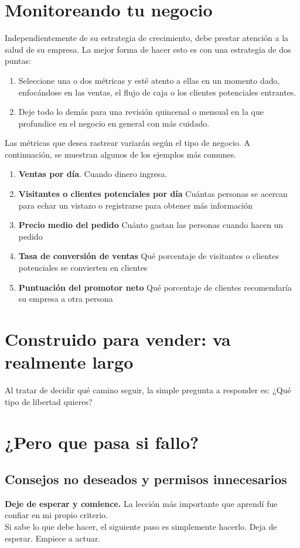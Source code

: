 \documentclass[10pt]{book}
\begin{document}
	\section{Monitoreando tu negocio}	
	    Independientemente de su estrategia de crecimiento, debe prestar atención a la salud de su empresa. La mejor forma de hacer esto es con una estrategia de dos puntas:
	   \begin{enumerate}[\bfseries 1)] 
		   \item Seleccione una o dos métricas y esté atento a ellas en un momento dado, enfocándose en las ventas, el flujo de caja o los clientes potenciales entrantes.
		    \item Deje todo lo demás para una revisión quincenal o mensual en la que profundice en el negocio en general con más cuidado.
	    \end{enumerate}
	    Las métricas que desea rastrear variarán según el tipo de negocio. A continuación, se muestran algunos de los ejemplos más comunes.
	    \begin{enumerate}[\bfseries 1)]
		\item \textbf{Ventas por día}. Cuando dinero ingresa.
		\item \textbf{Visitantes o clientes potenciales por día} Cuántas personas se acercan para echar un vistazo o registrarse para obtener más información
		\item \textbf{Precio medio del pedido} Cuánto gastan las personas cuando hacen un pedido
		\item \textbf{Tasa de conversión de ventas} Qué porcentaje de visitantes o clientes potenciales se convierten en clientes
		\item \textbf{Puntuación del promotor neto} Qué porcentaje de clientes recomendaría su empresa a otra persona
	    \end{enumerate}

	\section{Construido para vender: va realmente largo}
	    Al tratar de decidir qué camino seguir, la simple pregunta a responder es: ¿Qué tipo de libertad quieres?
	
	\section{¿Pero que pasa si fallo?}
	    \subsection{Consejos no deseados y permisos innecesarios}
		\textbf{Deje de esperar y comience.} La lección más importante que aprendí fue confiar en mi propio criterio.\\
		Si sabe lo que debe hacer, el siguiente paso es simplemente hacerlo. Deja de esperar. Empiece a actuar.
\end{document}
